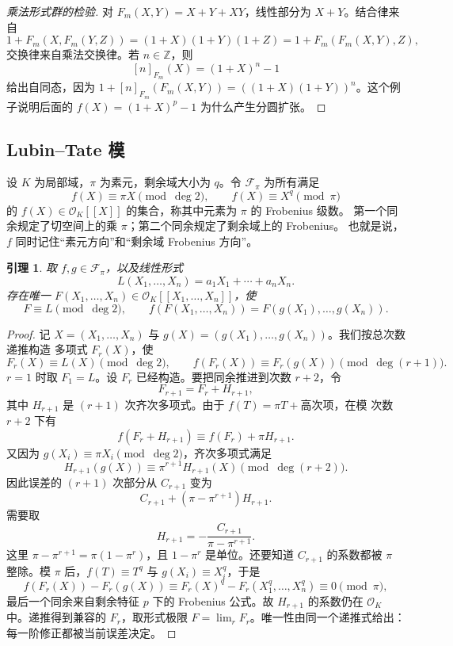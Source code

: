 \documentclass[11pt,a4paper,openany]{ctexbook}
\numberwithin{equation}{chapter}
\newcommand{\Z}{\mathbb{Z}}
\theoremstyle{plain}
\newtheorem{lemma}[theorem]{引理}
\theoremstyle{definition}
\theoremstyle{remark}
\begin{document}
\begin{proof}[乘法形式群的检验]
对 $F_m(X,Y)=X+Y+XY$，线性部分为 $X+Y$。结合律来自
\[
1+F_m(X,F_m(Y,Z))=(1+X)(1+Y)(1+Z)
=1+F_m(F_m(X,Y),Z),
\]
交换律来自乘法交换律。若 $n\in\Z$，则
\[
[n]_{F_m}(X)=(1+X)^n-1
\]
给出自同态，因为
$1+[n]_{F_m}(F_m(X,Y))=((1+X)(1+Y))^n$。这个例子说明后面的
$f(X)=(1+X)^p-1$ 为什么产生分圆扩张。
\end{proof}

\subsection{Lubin--Tate 模}

设 $K$ 为局部域，$\pi$ 为素元，剩余域大小为 $q$。令 $\mathcal F_\pi$ 为所有满足
\[
f(X)\equiv \pi X\pmod{\deg2},\qquad
f(X)\equiv X^q\pmod{\pi}
\]
的 $f(X)\in\mathcal O_K[[X]]$ 的集合，称其中元素为 $\pi$ 的 Frobenius 级数。
第一个同余规定了切空间上的乘 $\pi$；第二个同余规定了剩余域上的 Frobenius。
也就是说，$f$ 同时记住“素元方向”和“剩余域 Frobenius 方向”。

\begin{lemma}
取 $f,g\in\mathcal F_\pi$，以及线性形式
\[
L(X_1,\dots,X_n)=a_1X_1+\cdots+a_nX_n.
\]
存在唯一 $F(X_1,\dots,X_n)\in\mathcal O_K[[X_1,\dots,X_n]]$，使
\[
F\equiv L\pmod{\deg2},\qquad
f(F(X_1,\dots,X_n))=F(g(X_1),\dots,g(X_n)).
\]
\end{lemma}

\begin{proof}
记 $X=(X_1,\dots,X_n)$ 与 $g(X)=(g(X_1),\dots,g(X_n))$。我们按总次数递推构造
多项式 $F_r(X)$，使
\[
F_r(X)\equiv L(X)\pmod{\deg2},\qquad
f(F_r(X))\equiv F_r(g(X))\pmod{\deg(r+1)}.
\]
$r=1$ 时取 $F_1=L$。设 $F_r$ 已经构造。要把同余推进到次数 $r+2$，令
\[
F_{r+1}=F_r+H_{r+1},
\]
其中 $H_{r+1}$ 是 $(r+1)$ 次齐次多项式。由于 $f(T)=\pi T+\text{高次项}$，在模
次数 $r+2$ 下有
\[
f(F_r+H_{r+1})\equiv f(F_r)+\pi H_{r+1}.
\]
又因为 $g(X_i)\equiv \pi X_i\pmod{\deg2}$，齐次多项式满足
\[
H_{r+1}(g(X))\equiv \pi^{r+1}H_{r+1}(X)\pmod{\deg(r+2)}.
\]
因此误差的
$(r+1)$ 次部分从 $C_{r+1}$ 变为
\[
C_{r+1}+(\pi-\pi^{r+1})H_{r+1}.
\]
需要取
\[
H_{r+1}=-\frac{C_{r+1}}{\pi-\pi^{r+1}}.
\]
这里 $\pi-\pi^{r+1}=\pi(1-\pi^r)$，且 $1-\pi^r$ 是单位。还要知道
$C_{r+1}$ 的系数都被 $\pi$ 整除。模 $\pi$ 后，$f(T)\equiv T^q$ 与
$g(X_i)\equiv X_i^q$，于是
\[
f(F_r(X))-F_r(g(X))\equiv F_r(X)^q-F_r(X_1^q,\dots,X_n^q)\equiv0\pmod\pi,
\]
最后一个同余来自剩余特征 $p$ 下的 Frobenius 公式。故 $H_{r+1}$ 的系数仍在
$\mathcal O_K$ 中。递推得到兼容的 $F_r$，取形式极限
$F=\lim_rF_r$。唯一性由同一个递推式给出：每一阶修正都被当前误差决定。
\end{proof}
\end{document}
